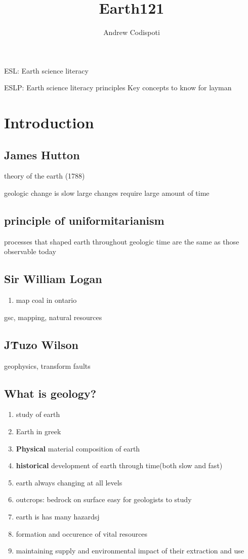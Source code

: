 \documentclass[11pt]{amsart}
\title{Earth121}
\author{Andrew Codispoti}
\begin{document}
\maketitle
\par ESL: Earth science literacy
\par ESLP: Earth science literacy principles Key concepts to know for layman
\section{Introduction}
\subsection{James Hutton}
\par theory of the earth (1788)
\par geologic change is slow large changes require large amount of time
\subsection{principle of uniformitarianism}
\par processes that shaped earth throughout geologic time are the same as those observable today
\subsection{Sir William Logan}
\begin{enumerate}
  \item map coal in ontario
\end{enumerate}
\par gsc, mapping, natural resources
\subsection{J\. Tuzo Wilson}
\par geophysics, transform faults
\subsection{What is geology?}
\begin{enumerate}
  \item study of earth
  \item Earth in greek
  \item \textbf{Physical} material composition of earth
  \item \textbf{historical} development of earth through time(both slow and
    fast)
  \item earth always changing at all levels
  \item outcrops: bedrock on surface {easy for geologists to study}
  \item earth is has many hazardsj
  \item formation and occurence of vital resources
  \item maintaining supply and environmental impact of their extraction and use
\end{enumerate}
\end{document}
